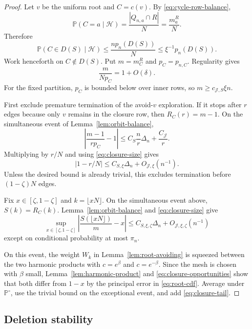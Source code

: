 \documentclass[11pt]{article}
\theoremstyle{definition}
\theoremstyle{remark}
\newcommand{\Pp}{\mathbb P}
\newcommand{\cH}{\mathcal H}
\newcommand{\cJ}{\mathcal J}
\begin{document}
\begin{proof}
Let $v$ be the uniform root and $C=c(v)$.  By
\eqref{eq:cycle-row-balance},
\[
 \Pp(C=a\mid\cH)=\frac{|Q_{n,a}\cap R|}{N}=\frac{m_a^R}{N}.
\]
Therefore
\begin{equation}
 \Pp(C\in D(S)\mid\cH)
 \le\frac{np_n(D(S))}{N}\le\xi^{-1}p_n(D(S)).
 \label{eq:closure-tail}
\end{equation}
Work henceforth on $C\notin D(S)$.  Put $m=m_C^R$ and $p_C=p_{n,C}$.
Regularity gives
\begin{equation}
 \frac{m}{Np_C}=1+O(\delta).
 \label{eq:closure-size}
\end{equation}
For the fixed partition, $p_C$ is bounded below over inner rows, so
$m\ge c_{\cJ,S}\xi n$.

First exclude premature termination of the avoid-$v$ exploration.  If it stops
after $r$ edges because only $v$ remains in the closure row, then
$R_C(r)=m-1$.  On the simultaneous event of
Lemma~\ref{lem:orbit-balance},
\[
 \left|\frac{m-1}{rp_C}-1\right|
 \le C_S\frac nr\Delta_n+\frac{C_{\cJ}}r.
\]
Multiplying by $r/N$ and using \eqref{eq:closure-size} gives
\begin{equation}
 |1-r/N|\le C_{S,\xi}\Delta_n+O_{\cJ,\xi}(n^{-1}).
 \label{eq:no-premature}
\end{equation}
Unless the desired bound is already trivial, this excludes termination before
$(1-\zeta)N$ edges.

Fix $x\in[\zeta,1-\zeta]$ and $k=\lfloor xN\rfloor$.  On the simultaneous
event above, $S(k)=R_C(k)$.  Lemma~\ref{lem:orbit-balance} and
\eqref{eq:closure-size} give
\begin{equation}
 \sup_{x\in[\zeta,1-\zeta]}
 \left|\frac{S(\lfloor xN\rfloor)}m-x\right|
 \le C_{S,\xi,\zeta}\Delta_n+O_{\cJ,\xi,\zeta}(n^{-1})
 \label{eq:closure-opportunities}
\end{equation}
except on conditional probability at most $\pi_n$.

On this event, the weight $W_k$ in Lemma~\ref{lem:root-avoiding} is squeezed between the
two harmonic products with $c=e^\beta$ and $c=e^{-\beta}$.  Since the mesh is
chosen with $\beta$ small, Lemma~\ref{lem:harmonic-product} and
\eqref{eq:closure-opportunities} show that both differ from $1-x$ by the
principal error in \eqref{eq:root-cdf}.  Average under $\Pp^\circ$, use the
trivial bound on the exceptional event, and add \eqref{eq:closure-tail}.
\end{proof}

\subsection{Deletion stability}
\end{document}

